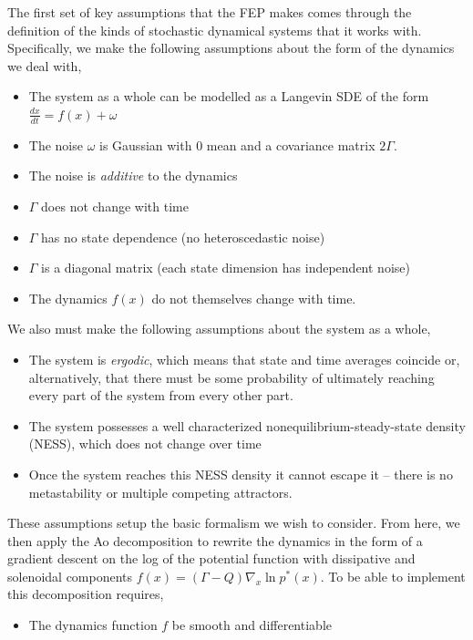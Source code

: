 The first set of key assumptions that the FEP makes comes through the definition of the kinds of stochastic dynamical systems that it works with. Specifically, we make the following assumptions about the form of the dynamics we deal with,
\begin{itemize}
    \item The system as a whole can be modelled as a Langevin SDE of the form $\frac{dx}{dt} = f(x) + \omega$
    \item The noise $\omega$ is Gaussian with 0 mean and a covariance matrix $2\Gamma$.
    \item The noise is \emph{additive} to the dynamics
    \item $\Gamma$ does not change with time
    \item $\Gamma$ has no state dependence (no heteroscedastic noise)
    \item $\Gamma$ is a diagonal matrix (each state dimension has independent noise)
    \item The dynamics $f(x)$ do not themselves change with time.
\end{itemize}
We also must make the following assumptions about the system as a whole,
\begin{itemize}
    \item The system is \emph{ergodic}, which means that state and time averages coincide or, alternatively, that there must be some probability of ultimately reaching every part of the system from every other part.
    \item The system possesses a well characterized nonequilibrium-steady-state density (NESS), which does not change over time
    \item Once the system reaches this NESS density it cannot escape it -- there is no metastability or multiple competing attractors.
\end{itemize}
These assumptions setup the basic formalism we wish to consider. From here, we then apply the Ao decomposition to rewrite the dynamics in the form of a gradient descent on the log of the potential function with dissipative and solenoidal components $f(x)= (\Gamma - Q)\nabla_x \ln p^*(x)$. To be able to implement this decomposition requires,
\begin{itemize}
    \item The dynamics function $f$ be smooth and differentiable
\end{itemize}


